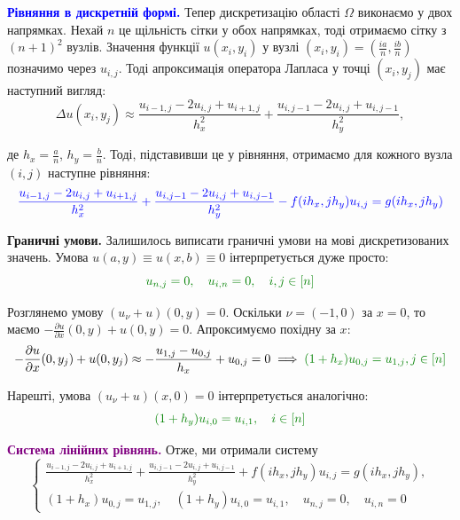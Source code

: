 \documentclass[14pt]{extarticle}
\begin{document}
\textcolor{blue}{\textbf{Рівняння в дискретній формі.}} Тепер дискретизацію
області $\Omega$ виконаємо у двох напрямках. Нехай $n$ це щільність сітки у обох
напрямках, тоді отримаємо сітку з $(n+1)^2$ вузлів. Значення функції $u(x_i,y_i)$ у
вузлі $(x_i,y_i)=(\frac{ia}{n},\frac{ib}{n})$ позначимо через $u_{i,j}$. Тоді
апроксимація оператора Лапласа у точці $(x_i,y_j)$ має наступний вигляд:
\begin{equation*}
    \Delta u(x_i,y_j) \approx \frac{u_{i-1,j} - 2u_{i,j} + u_{i+1,j}}{h_x^2} + \frac{u_{i,j-1} - 2u_{i,j} + u_{i,j-1}}{h_y^2},
\end{equation*}

де $h_x = \frac{a}{n}$, $h_y = \frac{b}{n}$. Тоді, підставивши це у рівняння, отримаємо для кожного вузла $(i,j)$ наступне рівняння:
\begin{equation*}
    \textcolor{blue}{\frac{u_{i-1,j} - 2u_{i,j} + u_{i+1,j}}{h_x^2} + \frac{u_{i,j-1} - 2u_{i,j} + u_{i,j-1}}{h_y^2} - f(ih_x,jh_y)u_{i,j} = g(ih_x,jh_y)}
\end{equation*}

\textcolor{green!50!black}{\textbf{Граничні умови.}} Залишилось виписати
граничні умови на мові дискретизованих значень. Умова $u(a,y) \equiv u(x,b)
\equiv 0$ інтерпретується дуже просто:
\begin{equation*}
    \textcolor{green!50!black}{u_{n,j} = 0, \quad u_{i,n} = 0, \quad i,j \in [n]}
\end{equation*}

Розглянемо умову $(u_{\nu}+u)(0,y) = 0$. Оскільки $\nu=(-1,0)$ за $x=0$,
то маємо $-\frac{\partial u}{\partial x}(0,y) + u(0,y) = 0$. Апроксимуємо 
похідну за $x$:
\begin{equation*}
    -\frac{\partial u}{\partial x}(0,y_j) + u(0,y_j) \approx -\frac{u_{1,j} - u_{0,j}}{h_x} + u_{0,j} = 0 \implies \textcolor{green!50!black}{(1+h_x)u_{0,j} = u_{1,j}, j \in [n]}
\end{equation*}

Нарешті, умова $(u_{\nu}+u)(x,0) = 0$ інтерпретується аналогічно:
\begin{equation*}
    \textcolor{green!50!black}{(1+h_y)u_{i,0} = u_{i,1}, \quad i \in [n]}
\end{equation*}

\textcolor{purple}{\textbf{Система лінійних рівнянь.}} Отже, ми отримали систему
\begin{equation*}
    \begin{cases}
        \frac{u_{i-1,j} - 2u_{i,j} + u_{i+1,j}}{h_x^2} + \frac{u_{i,j-1} - 2u_{i,j} + u_{i,j-1}}{h_y^2} + f(ih_x,jh_y)u_{i,j} = g(ih_x,jh_y), \\
        (1+h_x)u_{0,j} = u_{1,j}, \quad (1+h_y)u_{i,0} = u_{i,1}, \quad u_{n,j} = 0, \quad u_{i,n} = 0
    \end{cases}
\end{equation*}
\end{document}
